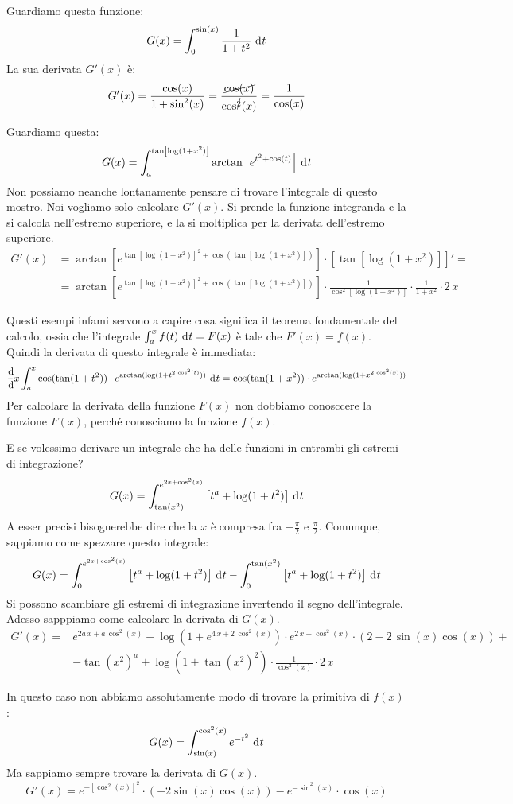 \begin{exmp}
Guardiamo questa funzione:
\[
G(x) = \int_{0}^{\sin(x)} \frac{1}{1 + t^2} \dx[t]
\]
La sua derivata $G'(x)$ \`e:
\[
G'(x) = \frac{\cos(x)}{1 + \sin^2(x)} = \frac{\cancel{\cos(x)}}{\cos^{\cancel{2}}(x)} = \frac{1}{\cos(x)}
\]

Guardiamo questa:
\[
G(x) = \int_{a}^{\tan \left[ \log(1 + x^2) \right]} \arctan \left[ e^{t^2 + \cos(t)} \right] \dx[t]
\]
Non possiamo neanche lontanamente pensare di trovare l'integrale di questo mostro. Noi vogliamo solo calcolare $G'(x)$. Si prende la funzione integranda e la si calcola nell'estremo superiore, e la si moltiplica per la derivata dell'estremo superiore.
\begin{align*}
G'(x) &= \arctan \left[ e^{{\tan \left[ \log(1 + x^2) \right]}^2 + \cos \left( \tan \left[ \log(1 + x^2) \right] \right)} \right] \cdot \left[ \tan \left[ \log(1 + x^2) \right] \right]' = \\
&= \arctan \left[ e^{{\tan \left[ \log(1 + x^2) \right]}^2 + \cos \left( \tan \left[ \log(1 + x^2) \right] \right)} \right] \cdot \frac{1}{\cos^2 \left[ \log(1 + x^2) \right]} \cdot \frac{1}{1 + x^2} \cdot 2 \, x
\end{align*}

Questi esempi infami servono a capire cosa significa il teorema fondamentale del calcolo, ossia che l'integrale $\int_{a}^{x} f(t) \dx[t] = F(x)$ \`e tale che $F'(x) = f(x)$. Quindi la derivata di questo integrale \`e immediata:
\[
\deriv{x} \int_{a}^{x} \cos (\tan(1 + t^2)) \cdot e^{\arctan(\log(1+t^{2 \, \cos^2(t)}))} \dx[t] = 
\cos (\tan(1 + x^2)) \cdot e^{\arctan(\log(1+x^{2 \, \cos^2(x)}))}
\]
Per calcolare la derivata della funzione $F(x)$ non dobbiamo conosccere la funzione $F(x)$, perch\'e conosciamo la funzione $f(x)$.

E se volessimo derivare un integrale che ha delle funzioni in entrambi gli estremi di integrazione?
\[
G(x) = \int_{\tan(x^2)}^{e^{2x + \cos^2(x)}} \left[ t^a + \log(1 + t^2) \right] \dx[t]
\]
A esser precisi bisognerebbe dire che la $x$ \`e compresa fra $- \frac{\pi}{2}$ e $\frac{\pi}{2}$. Comunque, sappiamo come spezzare questo integrale:
\[
G(x) = \int_{0}^{e^{2x + \cos^2(x)}} \left[ t^a + \log(1 + t^2) \right] \dx[t] - \int_{0}^{\tan(x^2)} \left[ t^a + \log(1 + t^2) \right] \dx[t]
\]
Si possono scambiare gli estremi di integrazione invertendo il segno dell'integrale. Adesso sapppiamo come calcolare la derivata di $G(x)$.
\begin{align*}
G'(x) =& e^{2a \, x + a \, \cos^2(x)} + \log(1 + e^{4 \, x + 2 \, \cos^2(x)}) \cdot e^{2 \, x + \cos^2 (x)} \cdot \left( 2 - 2 \, \sin(x) \cos(x) \right) + \\
&-  {\tan(x^2)}^a + \log(1 + {\tan(x^2)}^2) \cdot \frac{1}{\cos^2(x)} \cdot 2 \, x
\end{align*}

In questo caso non abbiamo assolutamente modo di trovare la primitiva di $f(x)$:
\[
G(x) = \int_{\sin(x)}^{\cos^2(x)} e^{-t^2} \dx[t]
\]
Ma sappiamo sempre trovare la derivata di $G(x)$.
\[
G'(x) = e^{-{\left[ \cos^2(x) \right]}^2} \cdot (- 2 \sin(x) \cos(x)) - 
e^{-\sin^2(x)} \cdot \cos(x)
\]
\end{exmp}

